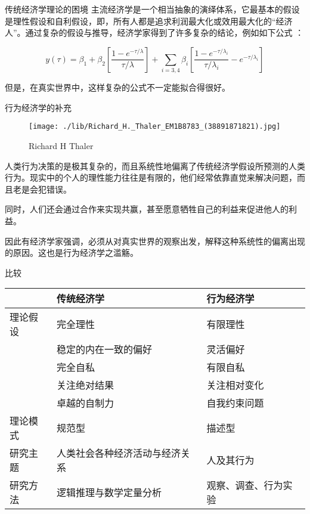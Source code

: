 \documentclass[presentation]{beamer}
\begin{document}
\begin{frame}{传统经济学理论的困境}
	主流经济学是一个相当抽象的演绎体系，它最基本的假设是理性假设和自利假设，即，所有人都是追求利润最大化或效用最大化的“经济人”。通过复杂的假设与推导，经济学家得到了许多复杂的结论，例如如下公式
	：

	$$
		y(\tau)=\beta_1+\beta_2[\frac{1-e^{-\tau/\lambda}}{\tau/\lambda}] +\sum_{i=3,4}\beta_i[\frac{1-e^{-\tau/\lambda_i}}{\tau/\lambda_i}-e^{-\tau/\lambda_i}]
	$$

	但是，在真实世界中，这样复杂的公式不一定能拟合得很好。
\end{frame}
\begin{frame}{行为经济学的补充}
	\begin{minipage}{0.2\linewidth}
		\begin{figure}
			\centering
			\texttt{[image: ./lib/Richard\_H.\_Thaler\_EM1B8783\_(38891871821).jpg]}
			\caption{Richard H Thaler}
			\label{fig:Richard_H._Thaler}
		\end{figure}
	\end{minipage}
	\begin{minipage}{0.75\linewidth}
		人类行为决策的是极其复杂的，而且系统性地偏离了传统经济学假设所预测的人类行为。现实中的个人的理性能力往往是有限的，他们经常依靠直觉来解决问题，而且老是会犯错误。

		同时，人们还会通过合作来实现共赢，甚至愿意牺牲自己的利益来促进他人的利益。

		因此有经济学家强调，必须从对真实世界的观察出发，解释这种系统性的偏离出现的原因。这也是行为经济学之滥觞。
	\end{minipage}
\end{frame}
\begin{frame}{比较}
	\begin{center}
		\begin{tabular}{lll}
			         & 传统经济学                     & 行为经济学           \\
			\hline
			理论假设 & 完全理性                       & 有限理性             \\
			         & 稳定的内在一致的偏好           & 灵活偏好             \\
			         & 完全自私                       & 有限自私             \\
			         & 关注绝对结果                   & 关注相对变化         \\
			         & 卓越的自制力                   & 自我约束问题         \\
			\hline
			理论模式 & 规范型                         & 描述型               \\
			\hline
			研究主题 & 人类社会各种经济活动与经济关系 & 人及其行为           \\
			\hline
			研究方法 & 逻辑推理与数学定量分析         & 观察、调查、行为实验 \\
		\end{tabular}
	\end{center}
\end{frame}
\end{document}
